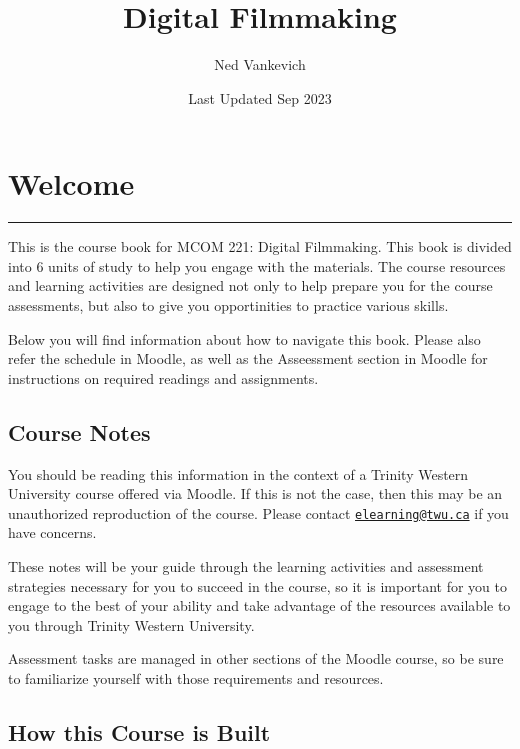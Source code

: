 \documentclass[
]{book}
\title{Digital Filmmaking}
\author{Ned Vankevich}
\date{Last Updated Sep 2023}
\begin{document}
\maketitle

{
\setcounter{tocdepth}{1}
\tableofcontents
}
\hypertarget{welcome}{%
\chapter*{Welcome}\label{welcome}}

\begin{center}\rule{0.5\linewidth}{0.5pt}\end{center}

This is the course book for MCOM 221: Digital Filmmaking. This book is divided into 6 units of study to help you engage with the materials. The course resources and learning activities are designed not only to help prepare you for the course assessments, but also to give you opportinities to practice various skills.

Below you will find information about how to navigate this book. Please also refer the schedule in Moodle, as well as the Asseessment section in Moodle for instructions on required readings and assignments.

\hypertarget{course-notes}{%
\section*{Course Notes}\label{course-notes}}

You should be reading this information in the context of a Trinity Western University course offered via Moodle. If this is not the case, then this may be an unauthorized reproduction of the course. Please contact \href{mailto:elearning@twu.ca}{\nolinkurl{elearning@twu.ca}} if you have concerns.

These notes will be your guide through the learning activities and assessment strategies necessary for you to succeed in the course, so it is important for you to engage to the best of your ability and take advantage of the resources available to you through Trinity Western University.

Assessment tasks are managed in other sections of the Moodle course, so be sure to familiarize yourself with those requirements and resources.

\hypertarget{how-this-course-is-built}{%
\section*{How this Course is Built}\label{how-this-course-is-built}}
\end{document}
